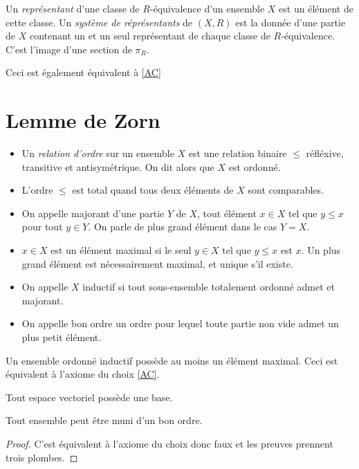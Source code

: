 \documentclass{cours}
\begin{document}
\begin{definition}
    Un \emph{représentant} d'une classe de $R$-équivalence d'un ensemble $X$ est un élément de cette classe. Un \emph{système de réprésentants} de $\left(X, R\right)$ est la donnée d'une partie de $X$ contenant un et un seul représentant de chaque classe de $R$-équivalence. C'est l'image d'une section de $\pi_{R}$.
\end{definition}
\begin{remark}
    Ceci est également équivalent à \ref{AC}
\end{remark}

\section{Lemme de Zorn}
\begin{definition}
    \begin{itemize}
        \item Un \emph{relation d'ordre} sur un ensemble $X$ est une relation binaire $\leq$ réfléxive, transitive et antisymétrique. On dit alors que $X$ est ordonné.
        \item L'ordre $\leq$ est total quand tous deux éléments de $X$ sont comparables. 
        \item On appelle majorant d'une partie $Y$ de $X$, tout élément $x \in X$ tel que $y \leq x$ pour tout $y \in Y$. On parle de plus grand élément dans le cas $Y = X$.
        \item $x \in X$ est un élément maximal si le seul $y \in X$ tel que $y \leq x$ est $x$. Un plus grand élément est nécessairement maximal, et unique s'il existe.
        \item On appelle $X$ inductif si tout sous-ensemble totalement ordonné admet et majorant.
        \item On appelle bon ordre un ordre pour lequel toute partie non vide admet un plus petit élément.
    \end{itemize}
\end{definition}

\begin{theorem}\label{Zorn}
    Un ensemble ordonné inductif possède au moins un élément maximal. Ceci est équivalent à l'axiome du choix \ref{AC}.
\end{theorem}
\begin{corollary}
    Tout espace vectoriel possède une base.
\end{corollary}
\begin{corollary}\label{Zermelo}
    Tout ensemble peut être muni d'un bon ordre.
\end{corollary}
\begin{proof}
    C'est équivalent à l'axiome du choix donc faux et les preuves prennent trois plombes.
\end{proof}
\newpage
\end{document}
